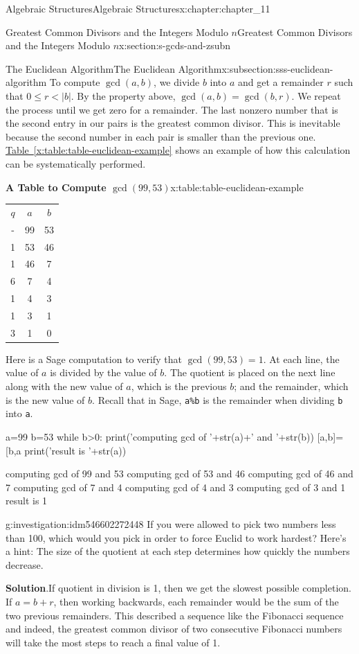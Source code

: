 \documentclass[oneside,10pt,]{book}
\newcommand{\blocktitlefont}{\relax}
\newcommand{\tabularfont}{\relax}
\newcommand{\xreffont}{\relax}
\newcommand{\mono}[1]{\texttt{#1}}
\numberwithin{equation}{section}
\begin{document}
\begin{chapterptx}{Algebraic Structures}{}{Algebraic Structures}{}{}{x:chapter:chapter_11}
\begin{sectionptx}{Greatest Common Divisors  and the Integers Modulo \(n\)}{}{Greatest Common Divisors  and the Integers Modulo \(n\)}{}{}{x:section:s-gcds-and-zsubn}
\begin{subsectionptx}{The Euclidean Algorithm}{}{The Euclidean Algorithm}{}{}{x:subsection:sss-euclidean-algorithm}
To compute \(\gcd(a,b)\), we divide \(b\) into \(a\) and get a remainder \(r\) such that \(0\leq  r <\lvert b\rvert \).  By the property above, \(\gcd(a, b)= \gcd(b, r)\).  We repeat the process until  we get zero for a remainder.  The last nonzero number that is the second entry in our pairs is the greatest common divisor.   This is inevitable because the second number in each pair is smaller than the previous one.  \hyperref[x:table:table-euclidean-example]{Table~{\xreffont\ref{x:table:table-euclidean-example}}} shows an example of how this calculation can be systematically performed.%
\begin{tableptx}{\textbf{A Table to Compute \(\gcd(99,53)\)}}{x:table:table-euclidean-example}{}%
\centering
{\tabularfont%
\begin{tabular}{ccc}
\(q\)&\(a\)&\(b\)\tabularnewline[0pt]
-&99&53\tabularnewline[0pt]
1&53&46\tabularnewline[0pt]
1&46&7\tabularnewline[0pt]
6&7&4\tabularnewline[0pt]
1&4&3\tabularnewline[0pt]
1&3&1\tabularnewline[0pt]
3&1&0
\end{tabular}
}%
\end{tableptx}%
Here is a Sage computation to verify that \(\gcd(99, 53) = 1\).   At each line, the value of \(a\) is divided by the value of \(b\).   The quotient is placed on the next line along with the new value of \(a\), which is the previous \(b\); and the remainder, which is the new value of \(b\).  Recall that in Sage, \mono{a\%b} is the remainder when dividing \mono{b} into \mono{a}.%
\begin{sageinput}
a=99
b=53
while b>0:
    print('computing gcd of '+str(a)+' and '+str(b))
    [a,b]=[b,a%
print('result is '+str(a))
\end{sageinput}
\begin{sageoutput}
computing gcd of 99 and 53
computing gcd of 53 and 46
computing gcd of 46 and 7
computing gcd of 7 and 4
computing gcd of 4 and 3
computing gcd of 3 and 1
result is 1
\end{sageoutput}
\begin{investigation}{}{g:investigation:idm546602272448}%
If you were allowed to pick two numbers less than 100, which would you pick in order to force Euclid to work hardest? Here's a hint:  The size of the quotient at each step determines how quickly the numbers decrease.%
\par\smallskip%
\noindent\textbf{\blocktitlefont Solution}.\hypertarget{g:solution:idm546602271712}{}\quad{}If quotient in division is 1, then we get the slowest possible completion.   If \(a = b + r\), then working backwards, each remainder would be the sum of the two previous remainders.  This described a sequence like the Fibonacci sequence and indeed, the greatest common divisor of two consecutive Fibonacci numbers will take the most steps to reach a final value of 1.%

\end{investigation}
\end{subsectionptx}
\end{sectionptx}
\end{chapterptx}
\end{document}
